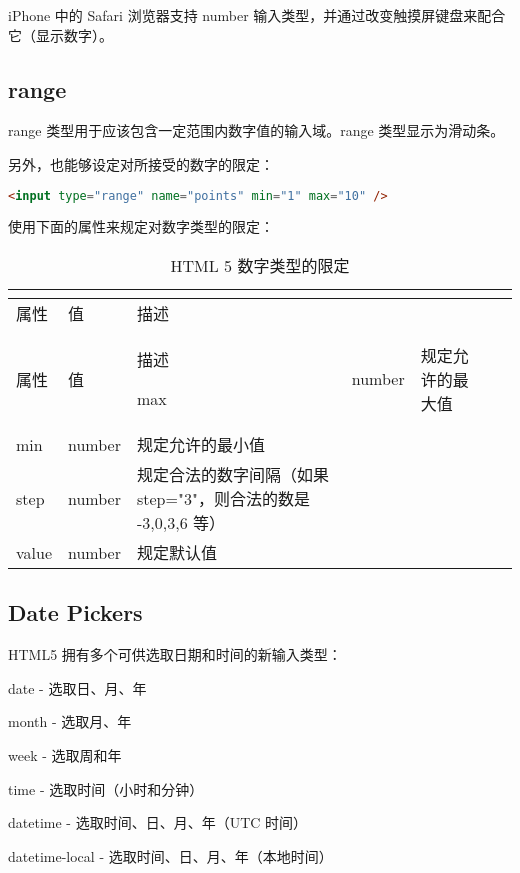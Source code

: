 iPhone 中的 Safari 浏览器支持 number 输入类型，并通过改变触摸屏键盘来配合它（显示数字）。



\subsection{range}

range 类型用于应该包含一定范围内数字值的输入域。range 类型显示为滑动条。

另外，也能够设定对所接受的数字的限定：

\begin{lstlisting}[language=HTML]
<input type="range" name="points" min="1" max="10" />
\end{lstlisting}

使用下面的属性来规定对数字类型的限定：


\begin{longtable}{|p{80pt}|p{50pt}|p{200pt}|}
\tabularnewline\hline
属性	&值	&描述
\endhead

\caption{HTML 5 数字类型的限定}\\
\hline
属性	&值	&描述
\endfirsthead

\endfoot

\endlastfoot
\hline
max	&number	&规定允许的最大值\\
\hline
min	&number	&规定允许的最小值\\
\hline
step	&number	&规定合法的数字间隔（如果 step="3"，则合法的数是 -3,0,3,6 等）\\
\hline
value&number	&规定默认值\\
\hline

\end{longtable}





\subsection{Date Pickers}


HTML5 拥有多个可供选取日期和时间的新输入类型：


\begin{compactitem}
\item date - 选取日、月、年
\item month - 选取月、年
\item week - 选取周和年
\item time - 选取时间（小时和分钟）
\item datetime - 选取时间、日、月、年（UTC 时间）
\item datetime-local - 选取时间、日、月、年（本地时间）
\end{compactitem}

